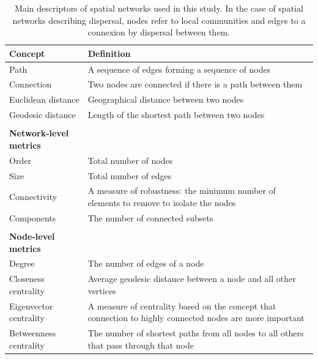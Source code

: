 \documentclass[12pt]{article}
\begin{document}
\begin{table}[c]
	\centering
	\begin{tabular}{p{5cm}p{8cm}}
		\hline
		\textbf{Concept} & \textbf{Definition} \\
		\hline
		Path & A sequence of edges forming a sequence of nodes \\
		Connection & Two nodes are connected if there is a path between them \\
		Euclidean distance & Geographical distance between two nodes \\
		Geodesic distance & Length of the shortest path between two nodes \\
		\\
		\textbf{Network-level metrics} & \\
		Order & Total number of nodes \\
		Size & Total number of edges \\
		Connectivity & A measure of robustness: the minimum number of elements to remove to isolate the nodes \\
		Components & The number of connected subsets\\
		\\
		\textbf{Node-level metrics} & \\
		Degree & The number of edges of a node \\
		Closeness centrality & Average geodesic distance between a node and all other vertices \\
		Eigenvector centrality & A measure of centrality based on the concept that connection to
		highly connected nodes are more important \\
		Betweenness centrality & The number of shortest paths from all nodes to all others that
		pass through that node \\
		\hline
	\end{tabular}
	\caption{Main descriptors of spatial networks used in this study. In the case of spatial networks describing dispersal, nodes refer to local communities and edges to a connexion by dispersal between them.}
\end{table}
\newpage

\end{document}
